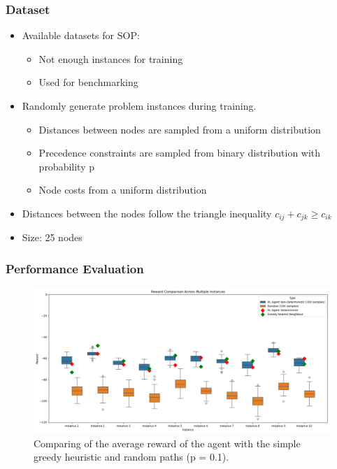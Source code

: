 \documentclass{beamer}
\begin{document}
\begin{frame}
    \frametitle{Dataset}
    \begin{itemize}
        \item Available datasets for SOP:
        \begin{itemize}
        \item Not enough instances for training
        \item Used for benchmarking
        \end{itemize}
        \item Randomly generate problem instances during training. 
        \begin{itemize}
        \item Distances between nodes are sampled from a uniform distribution
        \item Precedence constraints are sampled from binary distribution with probability p
        \item Node costs from a uniform distribution
        \end{itemize}
        \item Distances between the nodes follow the triangle inequality $c_{ij} + c_{jk} \geq c_{ik}$
        \item Size: 25 nodes
        
    \end{itemize}
\end{frame}


\begin{frame}
    \frametitle{Performance Evaluation}
    \begin{figure}
        \centering
        \includegraphics[width=1\textwidth]{10_instances_new.png}
        \caption{Comparing of the average reward of the agent with the simple greedy heuristic and random paths (p = 0.1).}
    \end{figure}
\end{frame}
\end{document}
